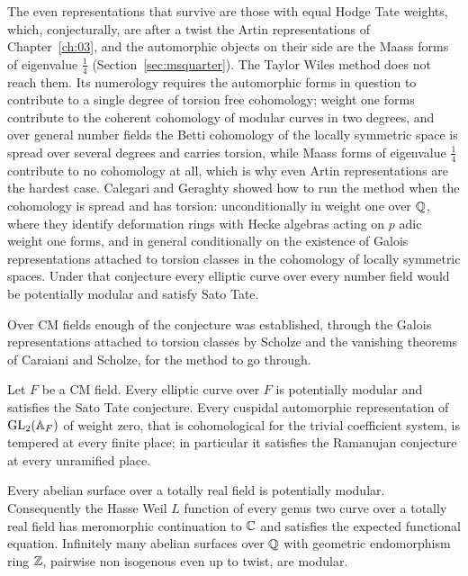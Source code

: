 The even representations that survive are those with equal Hodge Tate weights, which, conjecturally, are after a twist the Artin representations of Chapter~\ref{ch:03}, and the automorphic objects on their side are the Maass forms of eigenvalue $\frac14$ (Section~\ref{sec:msquarter}). The Taylor Wiles method does not reach them. Its numerology requires the automorphic forms in question to contribute to a single degree of torsion free cohomology; weight one forms contribute to the coherent cohomology of modular curves in two degrees, and over general number fields the Betti cohomology of the locally symmetric space is spread over several degrees and carries torsion, while Maass forms of eigenvalue $\frac14$ contribute to no cohomology at all, which is why even Artin representations are the hardest case. Calegari and Geraghty \cite{calegarigeraghty2018} showed how to run the method when the cohomology is spread and has torsion: unconditionally in weight one over $\mathbb{Q}$, where they identify deformation rings with Hecke algebras acting on $p$ adic weight one forms, and in general conditionally on the existence of Galois representations attached to torsion classes in the cohomology of locally symmetric spaces. Under that conjecture every elliptic curve over every number field would be potentially modular and satisfy Sato Tate.

Over CM fields enough of the conjecture was established, through the Galois representations attached to torsion classes by Scholze and the vanishing theorems of Caraiani and Scholze, for the method to go through.

\begin{theorem}\label{thm:calcmfield}
Let $F$ be a CM field. Every elliptic curve over $F$ is potentially modular and satisfies the Sato Tate conjecture. Every cuspidal automorphic representation of $\mathrm{GL}_2(\mathbb{A}_F)$ of weight zero, that is cohomological for the trivial coefficient system, is tempered at every finite place; in particular it satisfies the Ramanujan conjecture at every unramified place.
\end{theorem}

\begin{theorem}\label{thm:calbcgp}
Every abelian surface over a totally real field is potentially modular. Consequently the Hasse Weil $L$ function of every genus two curve over a totally real field has meromorphic continuation to $\mathbb{C}$ and satisfies the expected functional equation. Infinitely many abelian surfaces over $\mathbb{Q}$ with geometric endomorphism ring $\mathbb{Z}$, pairwise non isogenous even up to twist, are modular.
\end{theorem}


